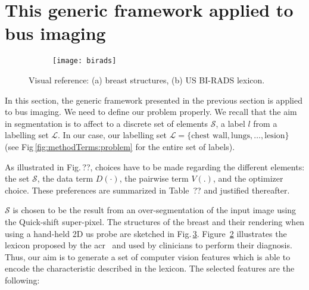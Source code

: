 \section{This generic framework applied to \ac{bus} imaging}\label{sec:method:dterm:feat}

\begin{figure}[t]
    \centering
    \hspace{\fill}
    \begin{subfigure}[b]{0.30\textwidth}
        \centering
        \label{fig:features:breast}
    \end{subfigure}
    \hfill
    \begin{subfigure}[b]{0.34\textwidth}   
        \centering 
        \texttt{[image: birads]}
        \label{fig:features:lexicon}
    \end{subfigure}
    \hspace{\fill}
    \caption {{\footnotesize Visual reference: (a) breast structures, (b) US BI-RADS lexicon.}} 
    \label{fig:features}
\end{figure}

In this section, the generic framework presented in the previous section is applied to \ac{bus} imaging. We need to define our problem properly. We recall that the aim in segmentation is to affect to a discrete set of elements $\mathcal{S}$, a label $l$ from a labelling set $\mathcal{L}$. In our case, our labelling set $\mathcal{L} = \{ \text{chest wall}, \text{lungs}, \dots, \text{lesion} \}$ (see Fig\,\ref{fig:methodTerms:problem} for the entire set of labels).

As illustrated in Fig.\,{\color{red}??}, choices have to be made regarding the different elements: the set $\mathcal{S}$, the data term $D(\cdot)$, the pairwise term $V(.)$, and the optimizer choice. These preferences are summarized in Table~{\color{red}??} and justified thereafter.

$\mathcal{S}$ is chosen to be the result from an over-segmentation of the input image using the Quick-shift super-pixel. The structures of the breast and their rendering when using a hand-held 2D \ac{us} probe are sketched in Fig.\,\ref{fig:features}. Figure~\ref{fig:features:lexicon} illustrates the lexicon proposed by the \ac{acr}~\cite{biradsus} and used by clinicians to perform their diagnosis. Thus, our aim is to generate a set of computer vision features which is able to encode the characteristic described in the lexicon. The selected features are the following:

